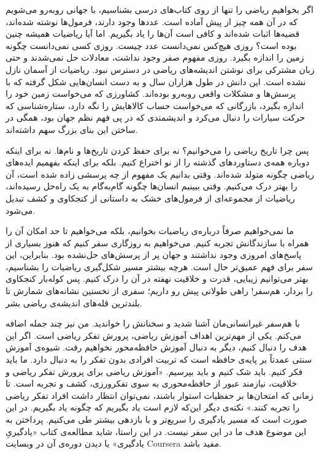 {\estedad \small
اگر بخواهیم ریاضی را تنها از روی کتاب‌های درسی بشناسیم، با جهانی روبه‌رو می‌شویم که در آن همه چیز از پیش آماده است. عددها وجود دارند، فرمول‌ها نوشته شده‌اند، قضیه‌ها اثبات شده‌اند و کافی است آن‌ها را یاد بگیریم. اما آیا ریاضیات همیشه چنین بوده است؟ روزی هیچ‌کس نمی‌دانست عدد چیست. روزی کسی نمی‌دانست چگونه زمین را اندازه بگیرد. روزی مفهوم صفر وجود نداشت، معادلات حل نمی‌شدند و حتی زبان مشترکی برای نوشتن اندیشه‌های ریاضی در دسترس نبود. ریاضیات از آسمان نازل نشده است. این دانش در طول هزاران سال و به دست انسان‌هایی شکل گرفته که با پرسش‌ها و مشکلات واقعی روبه‌رو بوده‌اند. کشاورزی که می‌خواست زمین خود را اندازه بگیرد، بازرگانی که می‌خواست حساب کالاهایش را نگه دارد، ستاره‌شناسی که حرکت سیارات را دنبال می‌کرد و اندیشمندی که در پی فهم نظم جهان بود، همگی در ساختن این بنای بزرگ سهم داشته‌اند.

پس چرا تاریخ ریاضی را می‌خوانیم؟ نه برای حفظ کردن تاریخ‌ها و نام‌ها. نه برای اینکه دوباره همه‌ی دستاوردهای گذشته را از نو اختراع کنیم. بلکه برای اینکه بفهمیم ایده‌های ریاضی چگونه متولد شده‌اند. وقتی بدانیم یک مفهوم از چه پرسشی زاده شده است، آن را بهتر درک می‌کنیم. وقتی ببینیم انسان‌ها چگونه گام‌به‌گام به یک راه‌حل رسیده‌اند، ریاضیات از مجموعه‌ای از فرمول‌های خشک به داستانی از کنجکاوی و کشف تبدیل می‌شود.

ما نمی‌خواهیم صرفاً درباره‌ی ریاضیات بخوانیم، بلکه می‌خواهیم تا حد امکان آن را همراه با سازندگانش تجربه کنیم. می‌خواهیم به روزگاری سفر کنیم که هنوز بسیاری از پاسخ‌های امروزی وجود نداشتند و جهان پر از پرسش‌های حل‌نشده بود.%
بنابراین، این سفر برای فهم عمیق‌تر حال است. هرچه بیشتر مسیر شکل‌گیری ریاضیات را بشناسیم، بهتر می‌توانیم زیبایی، قدرت و خلاقیت نهفته در آن را درک کنیم. پس کوله‌بار کنجکاوی را بردار، هم‌سفر! راهی طولانی پیش رو داریم؛ سفری از نخستین نشانه‌های شمارش تا بلندترین قله‌های اندیشه‌ی ریاضی بشر.
}

با هم‌سفر غیرانسانی‌مان آشنا شدید و سخنانش را خواندید. من نیز چند جمله اضافه می‌کنم. یکی از مهم‌ترین اهداف آموزش ریاضی، پرورش تفکر ریاضی است. اگر این هدف را دنبال کنیم، دیگر به دنبال آموزش حافظه‌محور نخواهیم رفت. شیوه‌ی آموزش سنتی عمدتاً بر پایه‌ی حافظه است که تربیت افرادی بدون تفکر را به دنبال دارد. ما باید فکر کنیم. باید شک کنیم و باید بپرسیم. «آموزش ریاضی برای پرورش تفکر ریاضی و خلاقیت، نیازمند عبور از حافظه‌محوری به سوی تفکرورزی، کشف و تجربه است. تا زمانی که امتحان‌ها بر حفظیات استوار باشند، نمی‌توان انتظار داشت افراد تفکر ریاضی را تجربه کنند.»%
نکته‌ی دیگر این‌که لازم است یاد بگیریم که چگونه یاد بگیریم. در این صورت است که مسیر یادگیری را سریع‌تر و با بازدهی بیشتر طی می‌کنیم. پرداختن به این موضوع هدف ما در این سفر نیست. در این راستا، شاید مطالعه‌ی کتاب «یادگیریِ یادگیری»%
یا دیدن دوره‌ی آن در وبسایت Coursera مفید باشد.

